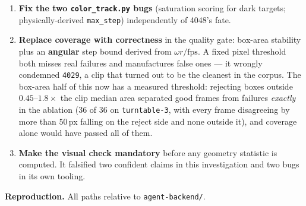 \documentclass[11pt,a4paper]{article}
\begin{document}
\begin{enumerate}
  silver tier --- clips whose orbit is synthesized from a rate rather than tracked
  (\S\ref{sec:fans}) --- is recorded in prose and in the sidecar's \texttt{tracking\_mode}, but
  \emph{not} in \texttt{pipeline\_inputs.json}, so neither the statistics nor the material
  generator can tell a measured trajectory from a generated one. The consequence is live: a
  generated perfect circle is presented to learners as an observation. This is the same class of
  defect as \S\ref{sec:coordbug} --- an agent-asserted fact the pipeline cannot verify --- and
  wants the same treatment.
  \item \textbf{Fix the two \texttt{color\_track.py} bugs} (saturation scoring for dark targets;
  physically-derived \texttt{max\_step}) independently of 4048's fate.
  \item \textbf{Replace coverage with correctness} in the quality gate: box-area stability plus an
  \textbf{angular} step bound derived from $\omega r/\mathrm{fps}$. A fixed pixel threshold both
  misses real failures and manufactures false ones --- it wrongly condemned \texttt{4029}, a clip
  that turned out to be the cleanest in the corpus. The box-area half of this now has a measured
  threshold: rejecting boxes outside $0.45$--$1.8\times$ the clip median area separated good frames
  from failures \emph{exactly} in the ablation (36 of 36 on \texttt{turntable-3}, with every frame
  disagreeing by more than $50$\,px falling on the reject side and none outside it), and coverage
  alone would have passed all of them.
  \item \textbf{Make the visual check mandatory} before any geometry statistic is computed. It
  falsified two confident claims in this investigation and two bugs in its own tooling.
\end{enumerate}

\vfill
\footnotesize
\textbf{Reproduction.} All paths relative to \texttt{agent-backend/}.
\end{document}
